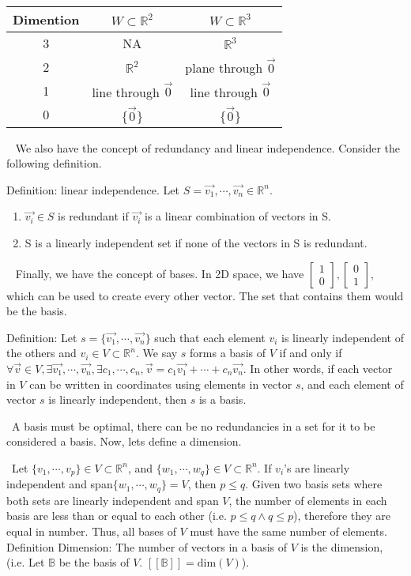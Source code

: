 \documentclass[11 pt]{article}
\begin{document}
\begin{center}
\begin{tabular}{|c|c|c|}
\hline
Dimention & $W\subset\mathbb{R}^2$ & $W\subset\mathbb{R}^3$\\\hline
3 & NA & $\mathbb{R}^3$\\
2 & $\mathbb{R}^2$ & plane through $\vec{0}$\\
1 & line through $\vec{0}$ & line through $\vec{0}$\\
0 & $\{\vec{0}\}$ & $\{\vec{0}\}$\\\hline
\end{tabular}
\end{center}

$\,\,\,$ We also have the concept of redundancy and linear independence. Consider the following definition.

Definition: linear independence. Let $S=\vec{v_1},\cdots,\vec{v_n}\in\mathbb{R}^n$.
\begin{enumerate}
\item $\vec{v_i}\in S$ is redundant if $\vec{v_i}$ is a linear combination of vectors in S.
\item S is a linearly independent set if none of the vectors in S is redundant.
\end{enumerate}

$\,\,\,$ Finally, we have the concept of bases. In 2D space, we have $\begin{bmatrix}1\\0\end{bmatrix},\begin{bmatrix}0\\1\end{bmatrix}$, which can be used to create every other vector. The set that contains them would be the basis.

Definition: Let $s=\{\vec{v_1},\cdots,\vec{v_n}\}$ such that each element $v_i$ is linearly independent of the others and $v_i\in V\subset\mathbb{R}^n$. We say $s$ forms a basis of $V$ if and only if $\forall \vec{v}\in V,\exists \vec{v_1},\cdots,\vec{v_n},\exists c_1,\cdots,c_n,\vec{v}=c_1\vec{v_1}+\cdots +c_n\vec{v_n}$. In other words, if each vector in $V$ can be written in coordinates using elements in vector $s$, and each element of vector $s$ is linearly independent, then $s$ is a basis.

$\,\,\,$A basis must be optimal, there can be no redundancies in a set for it to be considered a basis. Now, lets define a dimension.

$\,\,\,$Let $\{v_1,\cdots,v_p\}\in V\subset\mathbb{R}^n$, and $\{w_1,\cdots,w_q\}\in V\subset\mathbb{R}^n$. If $v_i$'s are linearly independent and span$\{w_1,\cdots,w_q\}=V$, then $p\leq q$. Given two basis sets where both sets are linearly independent and span $V$, the number of elements in each basis are less than or equal to each other (i.e. $p\leq q\land q\leq p$), therefore they are equal in number. Thus, all bases of $V$ must have the same number of elements.\\

Definition Dimension: The number of vectors in a basis of $V$ is the dimension, (i.e. Let $\mathbb{B}$ be the basis of $V$. $[[\mathbb{B}]]=\text{dim}(V)$).
\end{document}
